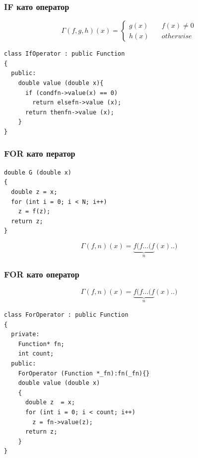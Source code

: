 \documentclass{beamer}
\begin{document}
\begin{frame}[fragile]
\frametitle{IF като оператор}

\begin{center}
$$
\Gamma(f,g,h)(x) = \left\{
        \begin{array}{ll}
            g(x) & \quad f(x) \neq 0 \\
            h(x) & \quad otherwise
        \end{array}
    \right.
$$


\begin{lstlisting}
class IfOperator : public Function
{
  public:
    double value (double x){
      if (condfn->value(x) == 0)
        return elsefn->value (x);
      return thenfn->value (x);
    }
}
\end{lstlisting}

\end{center}


\end{frame}



\begin{frame}[fragile]
\frametitle{FOR като ператор}

\begin{center}

\begin{lstlisting}
double G (double x)
{
  double z = x;
  for (int i = 0; i < N; i++)
    z = f(z);
  return z;
}
\end{lstlisting}

\end{center}


$$
\Gamma(f,n)(x) = \underbrace{f(f...(f}_n(x)..)
$$



\end{frame}




\begin{frame}[fragile]
\frametitle{FOR като оператор}

\begin{center}

$$
\Gamma(f,n)(x) = \underbrace{f(f...(f}_n(x)..)
$$



\begin{lstlisting}
class ForOperator : public Function
{
  private:
    Function* fn;
    int count;
  public:
    ForOperator (Function *_fn):fn(_fn){}
    double value (double x)
    {
      double z  = x;
      for (int i = 0; i < count; i++)
        z = fn->value(z);
      return z;
    }
}
\end{lstlisting}

\end{center}


\end{frame}
\end{document}
